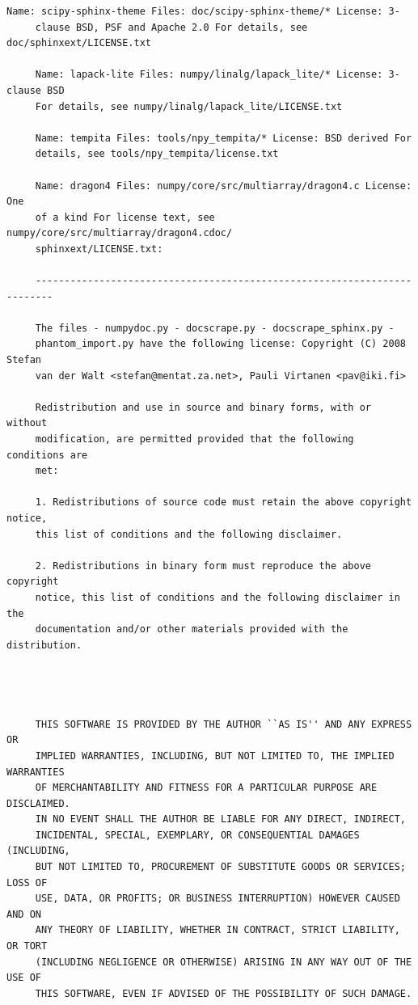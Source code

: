 \begin{lstlisting}[basicstyle=\ttfamily\footnotesize,breaklines=true]
     Name: scipy-sphinx-theme Files: doc/scipy-sphinx-theme/* License: 3-
     clause BSD, PSF and Apache 2.0 For details, see doc/sphinxext/LICENSE.txt

     Name: lapack-lite Files: numpy/linalg/lapack_lite/* License: 3-clause BSD
     For details, see numpy/linalg/lapack_lite/LICENSE.txt

     Name: tempita Files: tools/npy_tempita/* License: BSD derived For
     details, see tools/npy_tempita/license.txt

     Name: dragon4 Files: numpy/core/src/multiarray/dragon4.c License: One
     of a kind For license text, see numpy/core/src/multiarray/dragon4.cdoc/
     sphinxext/LICENSE.txt:

     -------------------------------------------------------------------------

     The files - numpydoc.py - docscrape.py - docscrape_sphinx.py -
     phantom_import.py have the following license: Copyright (C) 2008 Stefan
     van der Walt <stefan@mentat.za.net>, Pauli Virtanen <pav@iki.fi>

     Redistribution and use in source and binary forms, with or without
     modification, are permitted provided that the following conditions are
     met:

     1. Redistributions of source code must retain the above copyright notice,
     this list of conditions and the following disclaimer.

     2. Redistributions in binary form must reproduce the above copyright
     notice, this list of conditions and the following disclaimer in the
     documentation and/or other materials provided with the distribution.




     THIS SOFTWARE IS PROVIDED BY THE AUTHOR ``AS IS'' AND ANY EXPRESS OR
     IMPLIED WARRANTIES, INCLUDING, BUT NOT LIMITED TO, THE IMPLIED WARRANTIES
     OF MERCHANTABILITY AND FITNESS FOR A PARTICULAR PURPOSE ARE DISCLAIMED.
     IN NO EVENT SHALL THE AUTHOR BE LIABLE FOR ANY DIRECT, INDIRECT,
     INCIDENTAL, SPECIAL, EXEMPLARY, OR CONSEQUENTIAL DAMAGES (INCLUDING,
     BUT NOT LIMITED TO, PROCUREMENT OF SUBSTITUTE GOODS OR SERVICES; LOSS OF
     USE, DATA, OR PROFITS; OR BUSINESS INTERRUPTION) HOWEVER CAUSED AND ON
     ANY THEORY OF LIABILITY, WHETHER IN CONTRACT, STRICT LIABILITY, OR TORT
     (INCLUDING NEGLIGENCE OR OTHERWISE) ARISING IN ANY WAY OUT OF THE USE OF
     THIS SOFTWARE, EVEN IF ADVISED OF THE POSSIBILITY OF SUCH DAMAGE.


\end{lstlisting}
